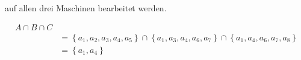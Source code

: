 auf allen drei Maschinen bearbeitet werden.

\begin{align}
	 A \cap B \cap C\\
	& =\left\{  a_1, a_2,a_3,a_4,a_5\right\} \cap \left\{a_1,a_3,a_4,a_6, a_7\right\} \cap \left\{ a_1, a_4, a_6, a_7, a_8 \right\}\\
	& = \left\{a_1,a_4\right\} 
\end{align}